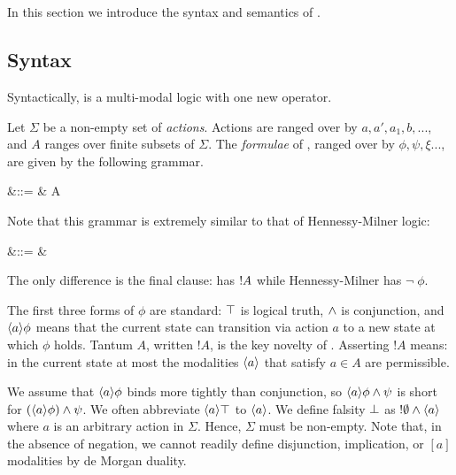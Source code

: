 \section{\Cathoristic{}}\label{coreEL}

In this section we introduce the syntax and semantics of \cathoristic{}.

\subsection{Syntax}
\label{elsyntax}
\NI Syntactically, \cathoristic{} is a multi-modal logic with one new
operator.

\begin{definition} Let $\Sigma$ be a non-empty set of \emph{actions}.
Actions are ranged over by $a, a', a_1, b, ...$, and $A$ ranges over
finite subsets of $\Sigma$. The \emph{formulae} of \cathoristic{}, ranged over by $\phi,
\psi, \xi ...$, are given by the
following grammar.

\begin{GRAMMAR}
  \phi 
     &\quad ::= \quad & 
  \TRUE 
     \VERTICAL 
  \phi \AND \phi
     \VERTICAL 
     \VERTICAL 
  \fBang A 
\end{GRAMMAR}
\end{definition}
Note that this grammar is extremely similar to that of Hennessy-Milner logic\cite{HennessyM:alglawfndac}:
\begin{GRAMMAR}
  \phi 
     &\quad ::= \quad & 
  \TRUE 
     \VERTICAL 
  \phi \AND \phi
     \VERTICAL 
     \VERTICAL 
  \neg \; \phi
\end{GRAMMAR}
The only difference is the final clause: \Cathoristic{} has $! A$ while Hennessy-Milner has $\neg \; \phi$.

The first three forms of $\phi$ are standard: $\top$ is logical truth, $\land$
is conjunction, and $\langle a \rangle \phi$ means that the current state can
transition via action $a$ to a new state at which $\phi$ holds. 
Tantum
$A$, written $!A$, is the key novelty of \cathoristic{}.  Asserting
$!A$ means: in the current state at most the modalities $\langle a \rangle$
that satisfy $a \in A$ are permissible.

We assume that $\langle a \rangle \phi$ binds more tightly than conjunction, so
$\langle a \rangle \phi \land \psi$ is short for $(\langle a \rangle \phi) \land \psi$.
We often abbreviate $\langle a \rangle \top$ to $\langle a \rangle$. We define falsity
$\bot$ as $!\emptyset \land \langle a \rangle$ where $a$ is an arbitrary
action in $\Sigma$. 
Hence, $\Sigma$ must be
non-empty. 
Note that, in the absence of negation, we cannot
readily define disjunction, implication, or $[a]$ modalities by de
Morgan duality. 

